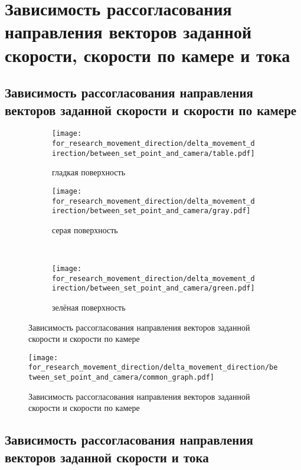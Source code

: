 \section{Зависимость рассогласования направления векторов заданной скорости, скорости по камере и тока}

\subsection{Зависимость рассогласования направления векторов заданной скорости и скорости по камере}

\begin{figure}[H]
    \centering
    \begin{subfigure}{0.49\textwidth}
        \centering
        \texttt{[image: for\_research\_movement\_direction/delta\_movement\_direction/between\_set\_point\_and\_camera/table.pdf]}
        \caption{гладкая поверхность}
    \end{subfigure}
    \hspace{0.005\textwidth}
    \begin{subfigure}{0.49\textwidth}
        \centering
        \texttt{[image: for\_research\_movement\_direction/delta\_movement\_direction/between\_set\_point\_and\_camera/gray.pdf]}
        \caption{серая поверхность}
    \end{subfigure} \\
    \vspace{4pt}
    \centering
    \begin{subfigure}{0.49\textwidth}
        \centering
        \texttt{[image: for\_research\_movement\_direction/delta\_movement\_direction/between\_set\_point\_and\_camera/green.pdf]}
        \caption{зелёная поверхность}
    \end{subfigure}
    \caption{Зависимость рассогласования направления векторов заданной скорости и скорости по камере}
\end{figure}

\begin{figure}[H]
    \centering
    \texttt{[image: for\_research\_movement\_direction/delta\_movement\_direction/between\_set\_point\_and\_camera/common\_graph.pdf]}
    \caption{Зависимость рассогласования направления векторов заданной скорости и скорости по камере}
\end{figure}

\subsection{Зависимость рассогласования направления векторов заданной скорости и тока}

